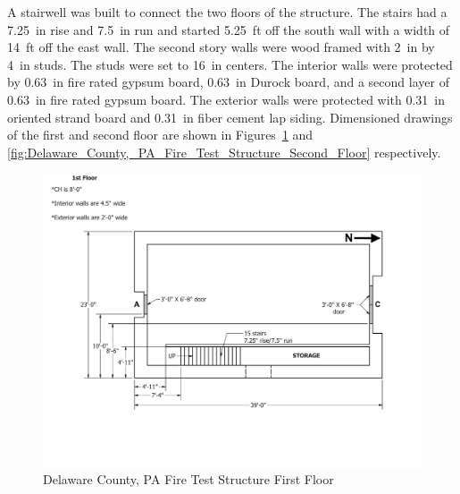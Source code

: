 \documentclass[12pt,oneside]{book}
\begin{document}
A stairwell was built to connect the two floors of the structure. The stairs had a 7.25~in rise and 7.5~in run and started 5.25~ft off the south wall with a width of 14~ft off the east wall. The second story walls were wood framed with 2~in by 4~in studs. The studs were set to 16~in centers. The interior walls were protected by 0.63~in fire rated gypsum board, 0.63~in Durock board, and a second layer of 0.63~in fire rated gypsum board. The exterior walls were protected with 0.31~in oriented strand board and 0.31~in fiber cement lap siding. Dimensioned drawings of the first and second floor are shown in Figures~\ref{fig:Delaware_County,_PA_Fire_Test_Structure_First_Floor} and \ref{fig:Delaware_County,_PA_Fire_Test_Structure_Second_Floor} respectively.

\begin{figure}[!ht]
	\centering
	\includegraphics[width=\columnwidth]{Figures/Air_Entrainment/West_Test_Structure_1st_Floor_original_nodim.pdf}
	\caption{Delaware County, PA Fire Test Structure First Floor}
	\label{fig:Delaware_County,_PA_Fire_Test_Structure_First_Floor}
\end{figure}
\end{document}
